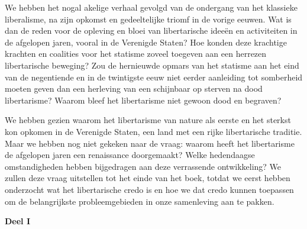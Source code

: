\documentclass[
  a5paper,
  smalldemyvopaper,10pt,twoside,onecolumn,openright,extrafontsizes,hidelinks]{memoir}
\begin{document}
We hebben het nogal akelige verhaal gevolgd van de ondergang van het
klassieke liberalisme, na zijn opkomst en gedeeltelijke triomf in de
vorige eeuwen. Wat is dan de reden voor de opleving en bloei van
libertarische ideeën en activiteiten in de afgelopen jaren, vooral in de
Verenigde Staten? Hoe konden deze krachtige krachten en coalities voor
het statisme zoveel toegeven aan een herrezen libertarische beweging?
Zou de hernieuwde opmars van het statisme aan het eind van de
negentiende en in de twintigste eeuw niet eerder aanleiding tot
somberheid moeten geven dan een herleving van een schijnbaar op sterven
na dood libertarisme? Waarom bleef het libertarisme niet gewoon dood en
begraven?

We hebben gezien waarom het libertarisme van nature als eerste en het
sterkst kon opkomen in de Verenigde Staten, een land met een rijke
libertarische traditie. Maar we hebben nog niet gekeken naar de vraag:
waarom heeft het libertarisme de afgelopen jaren een renaissance
doorgemaakt? Welke hedendaagse omstandigheden hebben bijgedragen aan
deze verrassende ontwikkeling? We zullen deze vraag uitstellen tot het
einde van het boek, totdat we eerst hebben onderzocht wat het
libertarische credo is en hoe we dat credo kunnen toepassen om de
belangrijkste probleemgebieden in onze samenleving aan te pakken.

\textbf{Deel I}
\end{document}
